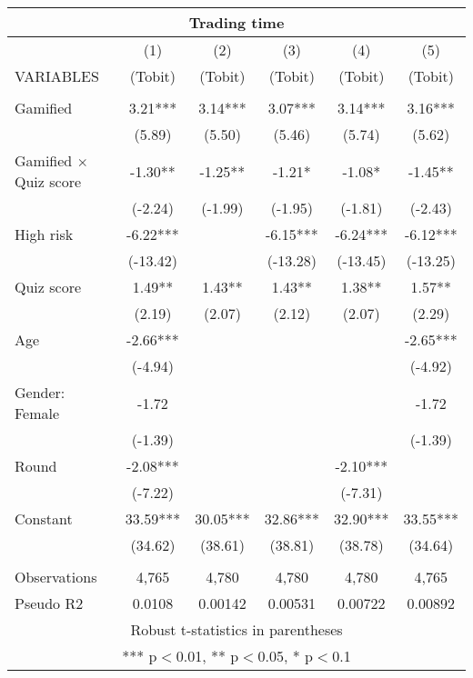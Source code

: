 \documentclass[]{article}
\begin{document}
\begin{tabular}{lccccc}
\multicolumn{6}{c}{Trading time} \\ \hline
 & (1) & (2) & (3) & (4) & (5) \\
VARIABLES & (Tobit) & (Tobit) & (Tobit) & (Tobit) & (Tobit) \\ \hline
 &  &  &  &  &  \\
Gamified & 3.21*** & 3.14*** & 3.07*** & 3.14*** & 3.16*** \\
 & (5.89) & (5.50) & (5.46) & (5.74) & (5.62) \\
Gamified $\times$ Quiz score & -1.30** & -1.25** & -1.21* & -1.08* & -1.45** \\
 & (-2.24) & (-1.99) & (-1.95) & (-1.81) & (-2.43) \\
High risk & -6.22*** &  & -6.15*** & -6.24*** & -6.12*** \\
 & (-13.42) &  & (-13.28) & (-13.45) & (-13.25) \\
Quiz score & 1.49** & 1.43** & 1.43** & 1.38** & 1.57** \\
 & (2.19) & (2.07) & (2.12) & (2.07) & (2.29) \\
Age & -2.66*** &  &  &  & -2.65*** \\
 & (-4.94) &  &  &  & (-4.92) \\
Gender: Female & -1.72 &  &  &  & -1.72 \\
 & (-1.39) &  &  &  & (-1.39) \\
Round & -2.08*** &  &  & -2.10*** &  \\
 & (-7.22) &  &  & (-7.31) &  \\
Constant & 33.59*** & 30.05*** & 32.86*** & 32.90*** & 33.55*** \\
 & (34.62) & (38.61) & (38.81) & (38.78) & (34.64) \\
 &  &  &  &  &  \\
Observations & 4,765 & 4,780 & 4,780 & 4,780 & 4,765 \\
 Pseudo R2 & 0.0108 & 0.00142 & 0.00531 & 0.00722 & 0.00892 \\ \hline
\multicolumn{6}{c}{ Robust t-statistics in parentheses} \\
\multicolumn{6}{c}{ *** p$<$0.01, ** p$<$0.05, * p$<$0.1} \\
\end{tabular}
\end{document}
